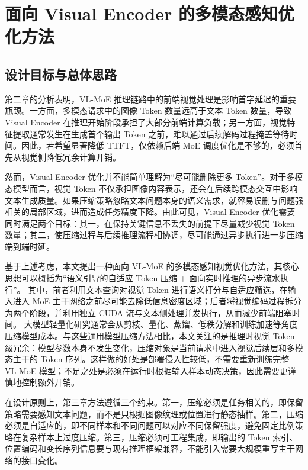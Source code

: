 \chapter{面向 Visual Encoder 的多模态感知优化方法}
\label{chap:encoder}

\section{设计目标与总体思路}
第二章的分析表明，VL-MoE 推理链路中的前端视觉处理是影响首字延迟的重要瓶颈。一方面，多模态请求中的图像 Token 数量远高于文本 Token 数量，导致 Visual Encoder 在推理开始阶段承担了大部分前端计算负载；另一方面，视觉特征提取通常发生在生成首个输出 Token 之前，难以通过后续解码过程掩盖等待时间。因此，若希望显著降低 TTFT，仅依赖后端 MoE 调度优化是不够的，必须首先从视觉侧降低冗余计算开销。

然而，Visual Encoder 优化并不能简单理解为“尽可能删除更多 Token”。对于多模态模型而言，视觉 Token 不仅承担图像内容表示，还会在后续跨模态交互中影响文本生成质量。如果压缩策略忽略文本问题本身的语义需求，就容易误删与问题强相关的局部区域，进而造成任务精度下降。由此可见，Visual Encoder 优化需要同时满足两个目标：其一，在保持关键信息不丢失的前提下尽量减少视觉 Token 数量；其二，使压缩过程与后续推理流程相协调，尽可能通过异步执行进一步压缩端到端时延。

基于上述考虑，本文提出一种面向 VL-MoE 的多模态感知视觉优化方法，其核心思想可以概括为“语义引导的自适应 Token 压缩 + 面向实时推理的异步流水执行”。
其中，前者利用文本查询对视觉 Token 进行语义打分与自适应筛选，在输入进入 MoE 主干网络之前尽可能去除低信息密度区域；后者将视觉编码过程拆分为两个阶段，并利用独立 CUDA 流与文本侧处理并发执行，从而减少前端阻塞时间。
大模型轻量化研究通常会从剪枝、量化、蒸馏、低秩分解和训练加速等角度压缩模型成本\cite{liang2025lightweight}。与这些通用模型压缩方法相比，本文关注的是推理时视觉 Token 级冗余：模型参数本身不发生变化，压缩对象是当前请求中进入视觉后续层和多模态主干的 Token 序列。这样做的好处是部署侵入性较低，不需要重新训练完整 VL-MoE 模型；不足之处是必须在运行时根据输入样本动态决策，因此需要更谨慎地控制额外开销。

在设计原则上，第三章方法遵循三个约束。第一，压缩必须是任务相关的，即保留策略需要感知文本问题，而不是只根据图像纹理或位置进行静态抽样。第二，压缩必须是自适应的，即不同样本和不同问题可以对应不同保留强度，避免固定比例策略在复杂样本上过度压缩。第三，压缩必须可工程集成，即输出的 Token 索引、位置编码和变长序列信息要与现有推理框架兼容，不能引入需要大规模重写主干网络的接口变化。

